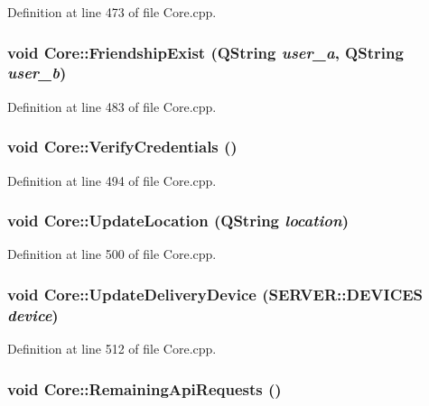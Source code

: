 Definition at line 473 of file Core.cpp.\hypertarget{classCore_0430da6765198a4f763ea7528f8e1e86}{
\subsubsection{\setlength{\rightskip}{0pt plus 5cm}void Core::FriendshipExist (QString {\em user\_\-a}, \/  QString {\em user\_\-b})}}
\label{classCore_0430da6765198a4f763ea7528f8e1e86}




Definition at line 483 of file Core.cpp.\hypertarget{classCore_e7b7355b923afe51411e3c949679904d}{
\subsubsection{\setlength{\rightskip}{0pt plus 5cm}void Core::VerifyCredentials ()}}
\label{classCore_e7b7355b923afe51411e3c949679904d}




Definition at line 494 of file Core.cpp.\hypertarget{classCore_62635d6cffb1fbef9f5c650518f83c67}{
\subsubsection{\setlength{\rightskip}{0pt plus 5cm}void Core::UpdateLocation (QString {\em location})}}
\label{classCore_62635d6cffb1fbef9f5c650518f83c67}




Definition at line 500 of file Core.cpp.\hypertarget{classCore_291a15a3ec5ebadc314c991f74cde776}{
\subsubsection{\setlength{\rightskip}{0pt plus 5cm}void Core::UpdateDeliveryDevice ({\bf SERVER::DEVICES} {\em device})}}
\label{classCore_291a15a3ec5ebadc314c991f74cde776}




Definition at line 512 of file Core.cpp.\hypertarget{classCore_0cf4c10e33b1158e651977210312ea13}{
\subsubsection{\setlength{\rightskip}{0pt plus 5cm}void Core::RemainingApiRequests ()}}
\label{classCore_0cf4c10e33b1158e651977210312ea13}




